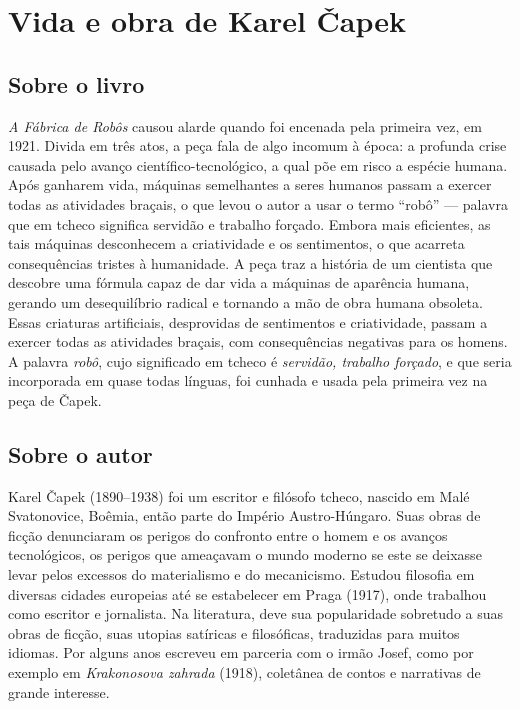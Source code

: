 \chapter{Vida e obra de Karel Čapek}

\section{Sobre o livro}

\textit{A Fábrica de Robôs} causou alarde quando foi encenada
pela primeira vez, em 1921. Divida em três atos, a peça fala de 
algo incomum à época: a profunda crise causada pelo avanço
científico-tecnológico, a qual põe em risco a espécie humana. 
Após ganharem vida, máquinas semelhantes a seres humanos passam a exercer
todas as atividades braçais, o que levou o autor a usar o termo ``robô''
--- palavra que em tcheco significa servidão e trabalho forçado. Embora
mais eficientes, as tais máquinas
desconhecem a criatividade e os sentimentos, o que acarreta
consequências tristes à humanidade. A peça traz a história de um cientista que descobre uma
fórmula capaz de dar vida a máquinas de aparência humana, gerando um
desequilíbrio radical e tornando a mão de obra
humana obsoleta. Essas criaturas artificiais, desprovidas de sentimentos
e criatividade, passam a exercer todas as atividades braçais, com
consequências negativas para os homens. A palavra \textit{robô}, cujo
significado em tcheco é \textit{servidão, trabalho forçado}, e que seria
incorporada em quase todas línguas, foi cunhada e usada pela primeira
vez na peça de Čapek.

\section{Sobre o autor}

Karel Čapek (1890--1938) foi um escritor e filósofo tcheco,
nascido em Malé Svatonovice, Boêmia, então parte do Império
Austro-Húngaro. Suas obras de ficção denunciaram os perigos do confronto
entre o homem e os avanços tecnológicos, os perigos que ameaçavam o
mundo moderno se este se deixasse levar pelos excessos do materialismo e
do mecanicismo. Estudou filosofia em diversas cidades europeias até se
estabelecer em Praga (1917), onde trabalhou como escritor e jornalista.
Na literatura, deve sua
popularidade sobretudo a suas obras de ficção, suas utopias satíricas e
filosóficas, traduzidas para muitos idiomas. Por alguns anos escreveu em
parceria com o irmão Josef, como por exemplo em \textit{Krakonosova zahrada}
(1918), coletânea de contos e narrativas de grande interesse.

